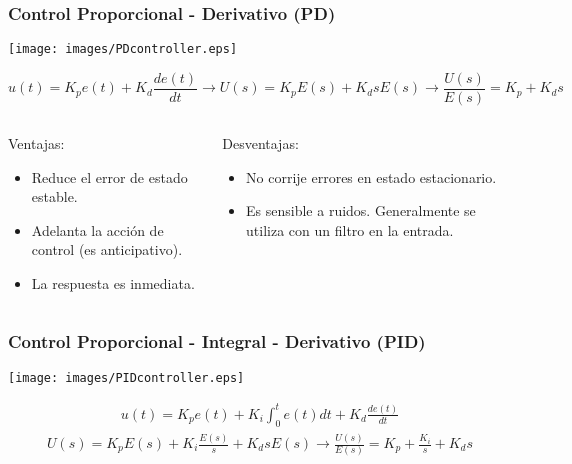 \documentclass[aspectratio=169,handout]{beamer}
\theoremstyle{definition}
\theoremstyle{plain}
\theoremstyle{remark}
\begin{document}
\begin{frame}[<+->]\frametitle{Control Proporcional - Derivativo (PD)}
\begin{center}
  \texttt{[image: images/PDcontroller.eps]}
\end{center}
\pause
\begin{equation*}
  u(t) = K_p e(t) + K_d \frac{de(t)}{dt} \longrightarrow U(s) = K_p E(s) + K_d s E(s) \rightarrow \frac{U(s)}{E(s)} = K_p + K_d s
\end{equation*}
\begin{columns}
\begin{column}{0.5\textwidth}
Ventajas:
\begin{itemize}
  \item Reduce el error de estado estable.
  \item Adelanta la acción de control (es anticipativo).
  \item La respuesta es inmediata.
\end{itemize}
\end{column}
\begin{column}{0.5\textwidth}
Desventajas:
\begin{itemize}
  \item No corrije errores en estado estacionario.
  \item Es sensible a ruidos. Generalmente se utiliza con un filtro en la entrada.
\end{itemize}
\end{column}
\end{columns}
\end{frame}

\begin{frame}[<+->]\frametitle{Control Proporcional - Integral - Derivativo (PID)}
\begin{center}
  \texttt{[image: images/PIDcontroller.eps]}
\end{center}
\pause
\begin{align*}
  u(t) = K_p e(t) + K_i \int_0^t e(t) dt + K_d \frac{de(t)}{dt}
\end{align*}
\pause
\begin{align*}
  U(s) = K_p E(s) + K_i \frac{E(s)}{s} + K_d s E(s) \rightarrow \frac{U(s)}{E(s)} = K_p + \frac{K_i}{s} + K_d s
\end{align*}
\end{frame}
\end{document}
